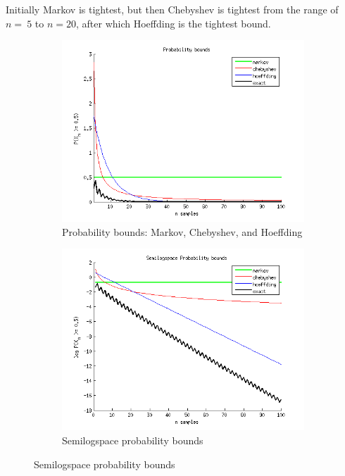 \documentclass[letterpaper,10pt]{article} %
\begin{document}
Initially Markov is tightest, but then Chebyshev is tightest from the range of $n=~5$ to $n=20$, after which Hoeffding is the tightest bound.

\begin{figure}[h]
\centering
\begin{subfigure}[b]{\textwidth}
\includegraphics[width=\textwidth]{figs/p1de}
\caption{Probability bounds: Markov, Chebyshev, and Hoeffding}
\label{fig:p1de}
\end{subfigure}%

\begin{subfigure}[b]{\textwidth}
\includegraphics[width=\textwidth]{figs/p1f}
\caption{Semilogspace probability bounds}
\label{fig:p1f}
\end{subfigure}


\end{figure}
\end{document}
